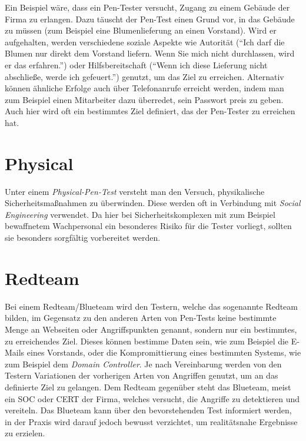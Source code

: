 Ein Beispiel wäre, dass ein Pen-Tester versucht, Zugang zu einem Gebäude der Firma zu erlangen. Dazu täuscht der Pen-Test einen Grund vor, in das Gebäude zu müssen (zum Beispiel eine Blumenlieferung an einen Vorstand). Wird er aufgehalten, werden verschiedene soziale Aspekte wie Autorität ("`Ich darf die Blumen nur direkt dem Vorstand liefern. Wenn Sie mich nicht durchlassen, wird er das erfahren."') oder Hilfsbereitschaft ("`Wenn ich diese Lieferung nicht abschließe, werde ich gefeuert."') genutzt, um das Ziel zu erreichen. Alternativ können ähnliche Erfolge auch über Telefonanrufe erreicht werden, indem man zum Beispiel einen Mitarbeiter dazu überredet, sein Passwort preis zu geben.\\

Auch hier wird oft ein bestimmtes Ziel definiert, das der Pen-Tester zu erreichen hat.

	\newpage
	\section{Physical}
	Unter einem \textit{Physical-Pen-Test} versteht man den Versuch, physikalische Sicherheitsmaßnahmen zu überwinden. Diese werden oft in Verbindung mit \textit{Social Engineering} verwendet. Da hier bei Sicherheitskomplexen mit zum Beispiel bewaffnetem Wachpersonal ein besonderes Risiko für die Tester vorliegt, sollten sie besonders sorgfältig vorbereitet werden.

	\section{Redteam}
	Bei einem Redteam/Blueteam wird den Testern, welche das sogenannte Redteam bilden, im Gegensatz zu den anderen Arten von Pen-Tests keine bestimmte Menge an Webseiten oder Angriffspunkten genannt, sondern nur ein bestimmtes, zu erreichendes Ziel. Dieses können bestimme Daten sein, wie zum Beispiel die E-Mails eines Vorstands, oder die Kompromittierung eines bestimmten Systems, wie zum Beispiel dem \textit{Domain Controller}. Je nach Vereinbarung werden von den Testern Variationen der vorherigen Arten von Angriffen genutzt, um an das definierte Ziel zu gelangen. Dem Redteam gegenüber steht das Blueteam, meist ein SOC oder CERT der Firma, welches versucht, die Angriffe zu detektieren und vereiteln. Das Blueteam kann über den bevorstehenden Test informiert werden, in der Praxis wird darauf jedoch bewusst verzichtet, um realitätsnahe Ergebnisse zu erzielen.\\
	

	
	
	
	
	
